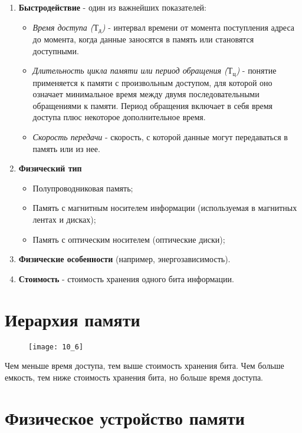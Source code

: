 \begin{enumerate}
  \item \textbf{Быстродействие} - один из важнейших показателей:
  \begin{itemize}
    \item \emph{Время доступа ($\mbox{Т}_{\mbox{д}}$)} - интервал времени от момента поступления адреса до момента, когда данные заносятся в память или становятся доступными.
    \item \emph{Длительность цикла памяти или период обращения ($\mbox{Т}_{\mbox{ц}}$)} - понятие применяется к памяти с произвольным доступом, для которой оно означает минимальное время между двумя последовательными обращениями к памяти. Период обращения включает в себя время доступа плюс некоторое дополнительное время.
    \item \emph{Скорость передачи} - скорость, с которой данные могут передаваться в память или из нее.
  \end{itemize}
  \item \textbf{Физический тип}
  \begin{itemize}
    \item Полупроводниковая память;
    \item Память с магнитным носителем информации (используемая в магнитных лентах и дисках);
    \item Память с оптическим носителем (оптические диски);
  \end{itemize}
  \item \textbf{Физические особенности} (например, энергозависимость).
  \item \textbf{Стоимость} - стоимость хранения одного бита информации.
\end{enumerate}
\section{Иерархия памяти}
\begin{figure}[!h]
\texttt{[image: 10\_6]}
\end{figure}
Чем меньше время доступа, тем выше стоимость хранения бита. Чем больше емкость, тем ниже стоимость хранения бита, но больше время доступа.

\section{Физическое устройство памяти}
